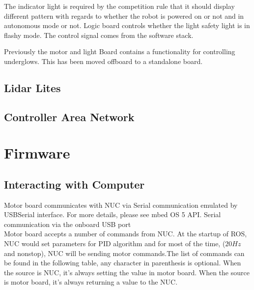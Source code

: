 \documentclass[letterpaper, 12pt]{article}
\begin{document}
The indicator light is required by the competition rule that it should display different pattern
with regards to whether the robot is powered on or not and in autonomous mode or not. 
Logic board controls whether the light safety light is in flashy mode. The control signal comes from
the software stack.

Previously the motor and light Board contains a functionality for controlling underglows. This has been
moved offboard to a standalone board.

\subsection{Lidar Lites}

\subsection{Controller Area Network}

\pagebreak

\section{Firmware}
\subsection{Interacting with Computer}
Motor board communicates with NUC via Serial communication emulated by USBSerial interface.
For more details, please see mbed OS 5 API. Serial communication via the onboard USB port \\

Motor board accepts a number of commands from NUC. At the startup of ROS, NUC would set
parameters for PID algorithm and for most of the time, ($20Hz$ and nonstop), NUC will be
sending motor commands.The list of commands can be found in the following table, any
character in parenthesis is optional. When the source is NUC, it's always setting the
value in motor board. When the source is motor board, it's always returning a value to
the NUC.\\
\end{document}

